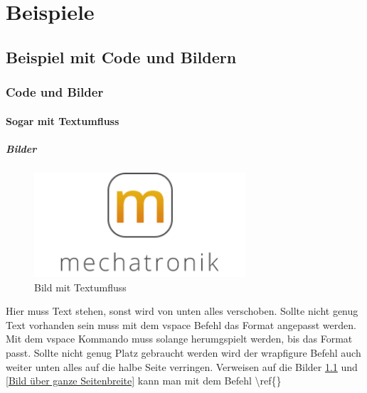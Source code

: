 \chapter{Beispiele}
\section{Beispiel mit Code und Bildern}
\subsection{Code und Bilder}
\subsubsection{Sogar mit Textumfluss}
\paragraph{Bilder}

\begin{figure}
\vspace{-30pt}
  \begin{center}
    \includegraphics[width=0.7\textwidth]{logoMecha}
  \end{center}
  \caption{Bild mit Textumfluss}
  \label{Bild mit Textumfluss}
  \vspace{-10pt}
\end{figure}

Hier muss Text stehen, sonst wird von unten alles verschoben. Sollte nicht genug Text vorhanden sein muss mit dem vspace Befehl das Format angepasst werden. Mit dem vspace Kommando muss solange herumgspielt werden, bis das Format passt. Sollte nicht genug Platz gebraucht werden wird der wrapfigure Befehl auch weiter unten alles auf die halbe Seite verringen. Verweisen auf die Bilder \ref{Bild mit Textumfluss} und \ref{Bild über ganze Seitenbreite} kann man mit dem Befehl \textbackslash{}ref\{\}

